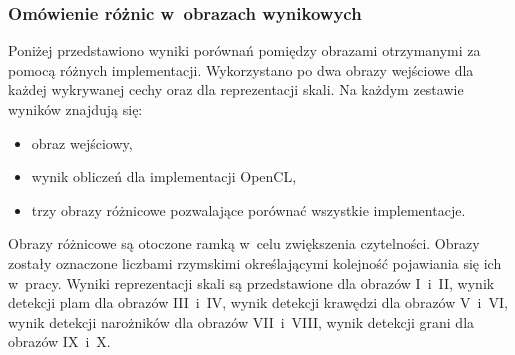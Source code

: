\subsubsection{Omówienie różnic w~obrazach wynikowych}
\label{subsec:prezentacjaObrazowRoznicowych}

Poniżej przedstawiono wyniki porównań pomiędzy obrazami otrzymanymi za pomocą różnych implementacji. Wykorzystano po dwa obrazy wejściowe dla każdej wykrywanej cechy oraz dla reprezentacji skali. Na każdym zestawie wyników znajdują się:
\begin{itemize}
\item obraz wejściowy,
\item wynik obliczeń dla implementacji OpenCL,
\item trzy obrazy różnicowe pozwalające porównać wszystkie implementacje.
\end{itemize}

Obrazy różnicowe są otoczone ramką w~celu zwiększenia czytelności. Obrazy zostały oznaczone liczbami rzymskimi określającymi kolejność pojawiania się ich w~pracy. Wyniki reprezentacji skali są przedstawione dla obrazów I~i~II, wynik detekcji plam dla obrazów III~i~IV, wynik detekcji krawędzi dla obrazów V~i~VI, wynik detekcji narożników dla obrazów VII~i~VIII, wynik detekcji grani dla obrazów IX~i~X.

